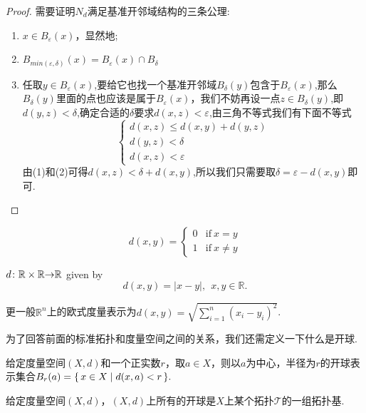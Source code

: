 \begin{proof}
需要证明$N_d$满足基准开邻域结构的三条公理:
\begin{enumerate}
	\item $x \in B_\varepsilon(x)$，显然地;
	\item $B_{min(\varepsilon,\delta)}(x)=B_{\varepsilon}(x) \cap B_{\delta}$
	\item 任取$y \in B_{\varepsilon}(x)$,要给它也找一个基准开邻域$B_{\delta}(y)$包含于$B_{\varepsilon}(x)$,那么$B_{\delta}(y)$里面的点也应该是属于$B_{\varepsilon}(x)$，我们不妨再设一点$z \in B_{\delta}(y)$,即$d(y,z) < \delta$,确定合适的$\delta$要求$d(x,z) < \varepsilon$,由三角不等式我们有下面不等式 \[\left\{
		\begin{array}{l}
			d(x,z)\leq d(x,y) + d(y,z) \\ 
			d(y,z) < \delta  \\ 
			d(x,z) < \varepsilon 
		\end{array}
	\right.\]由(1)和(2)可得$d(x,z) < \delta + d(x,y)$,所以我们只需要取$\delta = \varepsilon - d(x,y)$即可.
\end{enumerate}
\end{proof}

\begin{example}[离散拓扑]
$$
d(x, y) = \left\{\begin{matrix} 0 & \mathrm{if} \: x = y\\ 1 & \mathrm{if} \: x \neq y \end{matrix}\right.
$$
\end{example}

\begin{definition}
${d}\colon{\mathbb{R} \times \mathbb{R}}{\to}{\mathbb{R}}$ given by \[d(x,y) = |x-y|, \ \  x,y \in \mathbb{R}.\]
\end{definition}

更一般$\mathbb{R}^n$上的欧式度量表示为$d(x,y) = \sqrt{\sum_{i = 1}^n (x_i-y_i)^2}$.

为了回答前面的标准拓扑和度量空间之间的关系，我们还需定义一下什么是开球.

\begin{definition}
给定度量空间$(X,d)$和一个正实数$r$，取$a \in X$，则以$a$为中心，半径为$r$的开球表示集合$B_r(a)=\{\,x \in X\mid d(x,a) < r\,\}.$
\end{definition}


\begin{proposition}
给定度量空间$(X,d)$，$(X,d)$上所有的开球是$X$上某个拓扑$\mathcal{T}$的一组拓扑基. 
\end{proposition}

